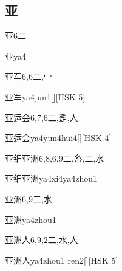\subsection*{亚}

\begin{Entry}{亚}{6}{⼆}
  \begin{Phonetics}{亚}{ya4}
  \end{Phonetics}
\end{Entry}

\begin{Entry}{亚军}{6,6}{⼆,⼍}
  \begin{Phonetics}{亚军}{ya4jun1}[][HSK 5]
  \end{Phonetics}
\end{Entry}

\begin{Entry}{亚运会}{6,7,6}{⼆,⾡,⼈}
  \begin{Phonetics}{亚运会}{ya4yun4hui4}[][HSK 4]
  \end{Phonetics}
\end{Entry}

\begin{Entry}{亚细亚洲}{6,8,6,9}{⼆,⽷,⼆,⽔}
  \begin{Phonetics}{亚细亚洲}{ya4xi4ya4zhou1}
  \end{Phonetics}
\end{Entry}

\begin{Entry}{亚洲}{6,9}{⼆,⽔}
  \begin{Phonetics}{亚洲}{ya4zhou1}
  \end{Phonetics}
\end{Entry}

\begin{Entry}{亚洲人}{6,9,2}{⼆,⽔,⼈}
  \begin{Phonetics}{亚洲人}{ya4zhou1 ren2}[][HSK 5]
  \end{Phonetics}
\end{Entry}

